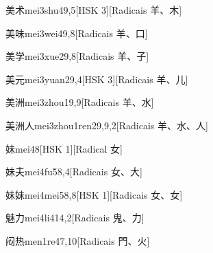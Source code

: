 \begin{entry}{美术}{mei3shu4}{9,5}[HSK 3][Radicais ⽺、⽊]
\end{entry}

\begin{entry}{美味}{mei3wei4}{9,8}[Radicais ⽺、⼝]
\end{entry}

\begin{entry}{美学}{mei3xue2}{9,8}[Radicais ⽺、⼦]
\end{entry}

\begin{entry}{美元}{mei3yuan2}{9,4}[HSK 3][Radicais ⽺、⼉]
\end{entry}

\begin{entry}{美洲}{mei3zhou1}{9,9}[Radicais ⽺、⽔]
\end{entry}

\begin{entry}{美洲人}{mei3zhou1ren2}{9,9,2}[Radicais ⽺、⽔、⼈]
\end{entry}

\begin{entry}{妹}{mei4}{8}[HSK 1][Radical ⼥]
\end{entry}

\begin{entry}{妹夫}{mei4fu5}{8,4}[Radicais ⼥、⼤]
\end{entry}

\begin{entry}{妹妹}{mei4mei5}{8,8}[HSK 1][Radicais ⼥、⼥]
\end{entry}

\begin{entry}{魅力}{mei4li4}{14,2}[Radicais ⿁、⼒]
\end{entry}

\begin{entry}{闷热}{men1re4}{7,10}[Radicais ⾨、⽕]
\end{entry}

